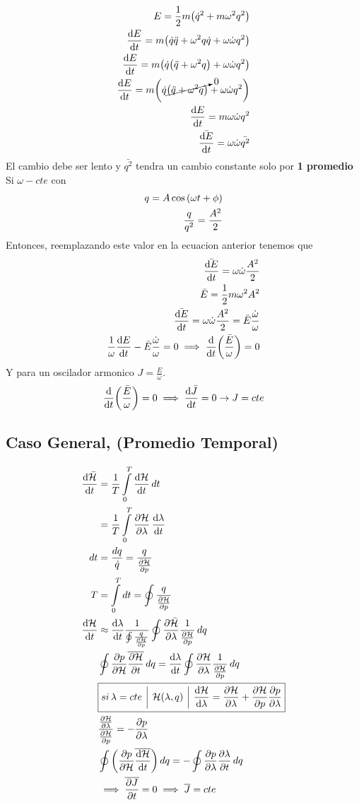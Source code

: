\documentclass[12pt]{article}
\renewcommand{\H}{\mathcal{H}}
\newcommand{\coss}[1]{\cos{\qty(#1)}}
\newcommand{\inv}[1]{\frac{1}{#1}}
\newcommand{\intt}[2]{\int\limits_{#1}^{#2}}
\renewcommand{\ss}[1]{\subsection{#1}}
\newcommand{\vl}{\,\,\, \vline \,\,\,}
\begin{document}
\begin{align}
E= \inv{2}m \qty(\dot{q}^2	+m\omega^2 q^2)\\
\dv{E}{t}=m\qty(\dot{q}\ddot{q}+ \omega^2 q\dot{q}+ \omega \dot{\omega}q^2)\\
\dv{E}{t}=m\qty(\dot{q}\qty(\ddot{q}+ \omega^2 q)+ \omega \dot{\omega}q^2)\\
\dv{E}{t}=m\qty(\dot{q}\cancelto{0}{\qty(\ddot{q}+ \omega^2 q)}+ \omega \dot{\omega}q^2)\\
\dv{E}{t}=m \omega \dot{\omega}q^2\\
\bar{\dv{E}{t}}= \omega \dot{\omega}\bar{q^2}
\end{align}
El cambio debe ser lento y $\bar{q^2}$ tendra un cambio constante solo por \textbf{1 promedio}
Si $\omega-cte$ con 
\begin{align}
q= A \coss{\omega t + \phi}\\
\frac{q}{q^2}= \frac{A^2}{2}
\end{align}
Entonces, reemplazando este valor en la ecuacion anterior tenemos que 
\begin{align}
	\bar{\dv{E}{t}}= \omega \dot{\omega}\frac{A^2}{2}\\
	\bar{E}= \inv{2}m\omega^2 A^2\\
	\bar{\dv{E}{t}}= \omega \dot{\omega}\frac{A^2}{2}=\bar{E}\frac{\dot{\omega}}{\omega}\\
	\inv{\omega}\dv{E}{t}- \bar{E}\frac{\dot{\omega}}{\omega}=0\implies \dv{t}\qty(\frac{\bar{E}}{\omega})=0
\end{align}
Y para un oscilador armonico $J= \frac{E}{\omega}$.\\
\begin{align}
	\dv{t}\qty(\frac{\bar{E}}{\omega})=0 \implies \dv{\bar{J}}{t}=0 \rightarrow J= cte
\end{align}
\ss{Caso General, (Promedio Temporal)}
\begin{align}
\dv{\bar{\H}}{t}&= \inv{T}\intt{0}{T} \dv{{\H}}{t} \,dt\\	&= \inv{T}\intt{0}{T} \pdv{{\H}}{\lambda} \, \dv{\lambda}{t}\\
dt&= \frac{dq}{\dot{q}}=\frac{q}{\pdv{\H}{p}}\\
T&=\intt{0}{T}dt=\oint \frac{q}{\pdv{\H}{p}}\\
\dv{\H}{t}&\approx \dv{\lambda}{t}\inv{\oint \frac{q}{\pdv{\H}{p}}} \oint \pdv{\bar{\H}}{\lambda} \inv{\pdv{\H}{p}}\, dq\\
&\oint \pdv{p}{\H} \overline{\pdv{\H}{t}}\, dq=\dv{\lambda}{t}\oint \pdv{\H}{\lambda} \inv{\pdv{\H}{p}}\, dq\\
&\boxed{si\, \lambda = cte\vl \H(\lambda,q)\vl \dv{\H}{\lambda}=\pdv{\H}{\lambda}+ \pdv{\H}{p} \pdv{p}{\lambda}}\\
&\frac{\pdv{\H}{\lambda}}{\pdv{\H}{p}}= -\pdv{p}{\lambda}\\
&\oint \qty(\pdv{p}{\H}\overline{\dv{\H}{t}})\,dq = - \oint \pdv{p}{\lambda} \pdv{\lambda}{t}\,dq\\
&\implies \overline{\pdv{J}{t}}=0\implies \overline{J}=cte
\end{align}
\end{document}

